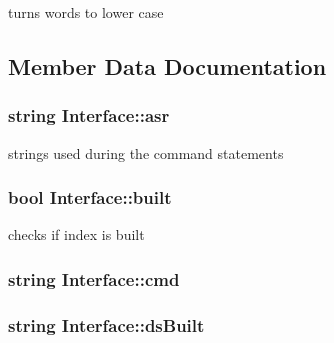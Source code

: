 turns words to lower case 



\subsection{Member Data Documentation}
\hypertarget{class_interface_a6dd99aca069dbc1054642d4c855b2c42}{}
\subsubsection[{asr}]{\setlength{\rightskip}{0pt plus 5cm}string Interface\+::asr\hspace{0.3cm}{\ttfamily [private]}}\label{class_interface_a6dd99aca069dbc1054642d4c855b2c42}


strings used during the command statements 

\hypertarget{class_interface_abd6ccab6c911d4beaaa8531036a92413}{}
\subsubsection[{built}]{\setlength{\rightskip}{0pt plus 5cm}bool Interface\+::built\hspace{0.3cm}{\ttfamily [private]}}\label{class_interface_abd6ccab6c911d4beaaa8531036a92413}


checks if index is built 

\hypertarget{class_interface_a10aa4deaad9c9a974ae522771f95a274}{}
\subsubsection[{cmd}]{\setlength{\rightskip}{0pt plus 5cm}string Interface\+::cmd\hspace{0.3cm}{\ttfamily [private]}}\label{class_interface_a10aa4deaad9c9a974ae522771f95a274}
\hypertarget{class_interface_a913b1344fae6395837321a94cc9f05dc}{}
\subsubsection[{ds\+Built}]{\setlength{\rightskip}{0pt plus 5cm}string Interface\+::ds\+Built\hspace{0.3cm}{\ttfamily [private]}}\label{class_interface_a913b1344fae6395837321a94cc9f05dc}
\hypertarget{class_interface_a81680e55e0deb21de6e1c7d802ccf2b8}{}
